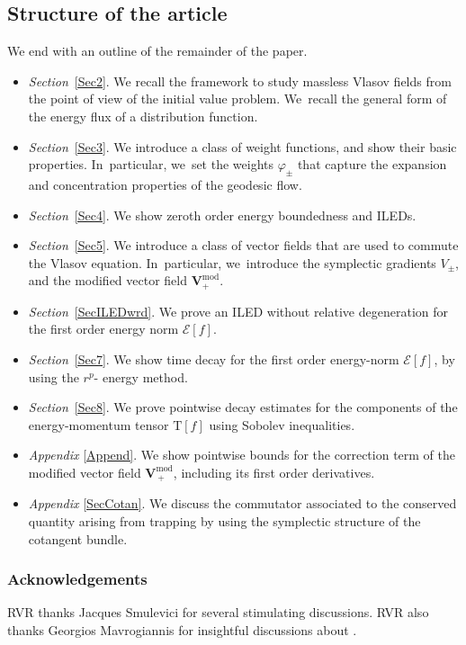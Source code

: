 \documentclass[JEP,XML,SOM,Unicode,published]{cedram}
\theoremstyle{plain}
\theoremstyle{definition}
\begin{document}
\subsection{Structure of the article}
We end with an outline of the remainder of the paper.

\begin{itemize}
\item {\didot\emph{Section}}~\ref{Sec2}. We recall the framework to study massless Vlasov fields from the point of view of the initial value problem. We~recall the general form of the energy flux of a distribution function.
\item {\didot\emph{Section}}~\ref{Sec3}. We introduce a class of weight functions, and show their basic properties. In~particular, we~set the weights $\varphi_{\pm}$ that capture the expansion and concentration properties of the geodesic flow.
\item {\didot\emph{Section}}~\ref{Sec4}. We show zeroth order energy boundedness and ILEDs.
\item {\didot\emph{Section}}~\ref{Sec5}. We introduce a class of vector fields that are used to commute the Vlasov equation. In~particular, we~introduce the symplectic gradients $V_{\pm}$, and the modified vector field $\pmb{V}_+^{\mathrm{mod}}$.
\item {\didot\emph{Section}}~\ref{SecILEDwrd}. We prove an ILED without relative degeneration for the first order energy norm $\mathcal{E}[f]$.
\item {\didot\emph{Section}}~\ref{Sec7}. We show time decay for the first order energy-norm $\mathcal{E}[f]$, by using the $r^p$- energy method.
\item {\didot\emph{Section}}~\ref{Sec8}. We prove pointwise decay estimates for the components of the energy-momentum tensor $\mathrm{T}[f]$ using Sobolev inequalities.
\item {\didot\emph{Appendix}} \ref{Append}. We show pointwise bounds for the correction term of the modified vector field $\pmb{V}_{\, +}^{\mathrm{mod}}$, including its first order derivatives.
\item {\didot\emph{Appendix}} \ref{SecCotan}. We discuss the commutator associated to the conserved quantity arising from trapping by using the symplectic structure of the cotangent bundle.
\end{itemize}

\subsubsection*{Acknowledgements}
RVR thanks Jacques Smulevici for several stimulating discussions. RVR also thanks Georgios Mavrogiannis for insightful discussions about \cite{Mavr23, Mavq}.
\end{document}
